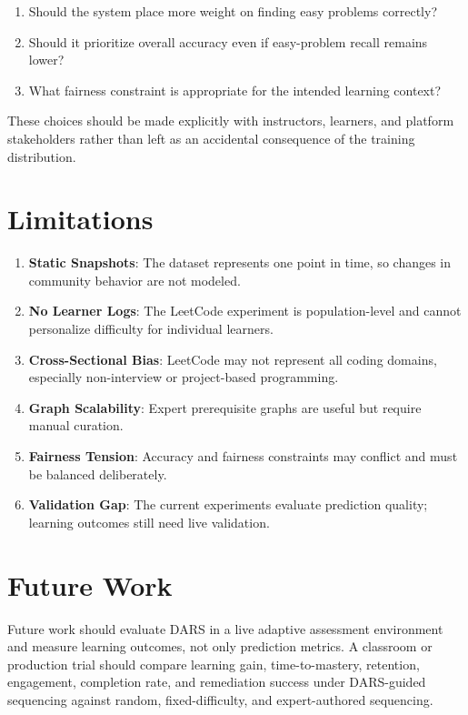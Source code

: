 \documentclass[conference]{IEEEtran}
\begin{document}
\begin{enumerate}
    \item Should the system place more weight on finding easy problems correctly?
    \item Should it prioritize overall accuracy even if easy-problem recall remains lower?
    \item What fairness constraint is appropriate for the intended learning context?
\end{enumerate}

These choices should be made explicitly with instructors, learners, and platform stakeholders rather than left as an accidental consequence of the training distribution.

\section{Limitations}

\begin{enumerate}
    \item \textbf{Static Snapshots}: The dataset represents one point in time, so changes in community behavior are not modeled.
    \item \textbf{No Learner Logs}: The LeetCode experiment is population-level and cannot personalize difficulty for individual learners.
    \item \textbf{Cross-Sectional Bias}: LeetCode may not represent all coding domains, especially non-interview or project-based programming.
    \item \textbf{Graph Scalability}: Expert prerequisite graphs are useful but require manual curation.
    \item \textbf{Fairness Tension}: Accuracy and fairness constraints may conflict and must be balanced deliberately.
    \item \textbf{Validation Gap}: The current experiments evaluate prediction quality; learning outcomes still need live validation.
\end{enumerate}

\section{Future Work}

Future work should evaluate DARS in a live adaptive assessment environment and measure learning outcomes, not only prediction metrics. A classroom or production trial should compare learning gain, time-to-mastery, retention, engagement, completion rate, and remediation success under DARS-guided sequencing against random, fixed-difficulty, and expert-authored sequencing.
\end{document}
